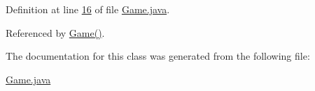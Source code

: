Definition at line \hyperlink{Game_8java_source_l00016}{16} of file \hyperlink{Game_8java_source}{Game.\-java}.



Referenced by \hyperlink{Game_8java_source_l00026}{Game()}.



The documentation for this class was generated from the following file\-:\begin{DoxyCompactItemize}
\item 
\hyperlink{Game_8java}{Game.\-java}\end{DoxyCompactItemize}

